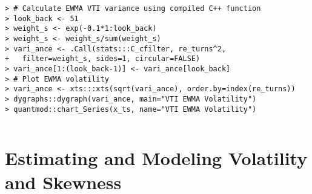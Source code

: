 \documentclass[10pt]{beamer}\usepackage[]{graphicx}\usepackage[]{color}
\makeatletter
\newenvironment{kframe}{%
 \def\at@end@of@kframe{}%
 \ifinner\ifhmode%
  \def\at@end@of@kframe{\end{minipage}}%
  \begin{minipage}{\columnwidth}%
 \fi\fi%
 \def\FrameCommand##1{\hskip\@totalleftmargin \hskip-\fboxsep
 \colorbox{shadecolor}{##1}\hskip-\fboxsep
     \hskip-\linewidth \hskip-\@totalleftmargin \hskip\columnwidth}%
 \MakeFramed {\advance\hsize-\width
   \@totalleftmargin\z@ \linewidth\hsize
   \@setminipage}}%
 {\par\unskip\endMakeFramed%
 \at@end@of@kframe}
\newenvironment{knitrout}{}{} %
\makeatother
\begin{document}
\begin{frame}[fragile,t]{\subsecname}
\begin{block}{}
\begin{columns}[T]
\begin{knitrout}
\begin{kframe}
\begin{verbatim}
> # Calculate EWMA VTI variance using compiled C++ function
> look_back <- 51
> weight_s <- exp(-0.1*1:look_back)
> weight_s <- weight_s/sum(weight_s)
> vari_ance <- .Call(stats:::C_cfilter, re_turns^2, 
+   filter=weight_s, sides=1, circular=FALSE)
> vari_ance[1:(look_back-1)] <- vari_ance[look_back]
> # Plot EWMA volatility
> vari_ance <- xts:::xts(sqrt(vari_ance), order.by=index(re_turns))
> dygraphs::dygraph(vari_ance, main="VTI EWMA Volatility")
> quantmod::chart_Series(x_ts, name="VTI EWMA Volatility")
\end{verbatim}
\end{kframe}
\end{knitrout}
  \end{columns}
\end{block}

\end{frame}



\section{Estimating and Modeling Volatility and Skewness}


\end{document}
